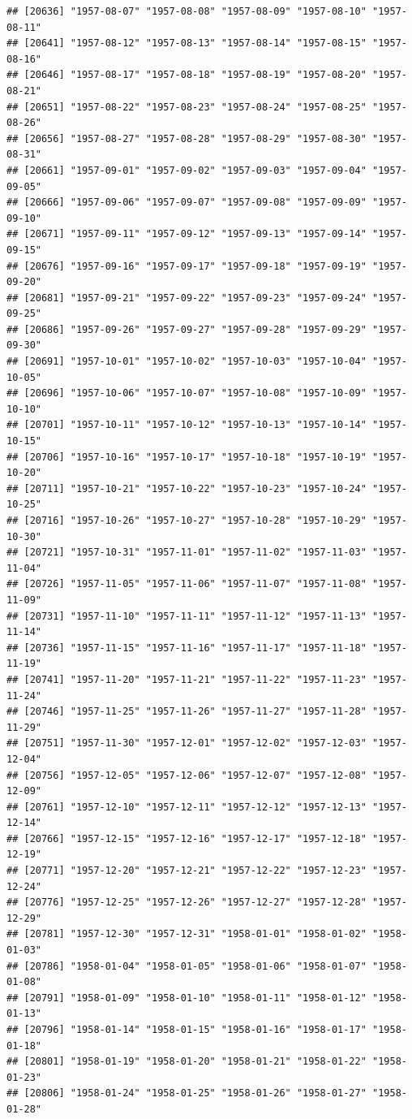 \documentclass{article}\usepackage[]{graphicx}\usepackage[]{color}
\makeatletter
\newenvironment{kframe}{%
 \def\at@end@of@kframe{}%
 \ifinner\ifhmode%
  \def\at@end@of@kframe{\end{minipage}}%
  \begin{minipage}{\columnwidth}%
 \fi\fi%
 \def\FrameCommand##1{\hskip\@totalleftmargin \hskip-\fboxsep
 \colorbox{shadecolor}{##1}\hskip-\fboxsep
     \hskip-\linewidth \hskip-\@totalleftmargin \hskip\columnwidth}%
 \MakeFramed {\advance\hsize-\width
   \@totalleftmargin\z@ \linewidth\hsize
   \@setminipage}}%
 {\par\unskip\endMakeFramed%
 \at@end@of@kframe}
\newenvironment{knitrout}{}{} %
\makeatother
\begin{document}
\begin{description}
\begin{knitrout}
\begin{kframe}
\begin{verbatim}
## [20636] "1957-08-07" "1957-08-08" "1957-08-09" "1957-08-10" "1957-08-11"
## [20641] "1957-08-12" "1957-08-13" "1957-08-14" "1957-08-15" "1957-08-16"
## [20646] "1957-08-17" "1957-08-18" "1957-08-19" "1957-08-20" "1957-08-21"
## [20651] "1957-08-22" "1957-08-23" "1957-08-24" "1957-08-25" "1957-08-26"
## [20656] "1957-08-27" "1957-08-28" "1957-08-29" "1957-08-30" "1957-08-31"
## [20661] "1957-09-01" "1957-09-02" "1957-09-03" "1957-09-04" "1957-09-05"
## [20666] "1957-09-06" "1957-09-07" "1957-09-08" "1957-09-09" "1957-09-10"
## [20671] "1957-09-11" "1957-09-12" "1957-09-13" "1957-09-14" "1957-09-15"
## [20676] "1957-09-16" "1957-09-17" "1957-09-18" "1957-09-19" "1957-09-20"
## [20681] "1957-09-21" "1957-09-22" "1957-09-23" "1957-09-24" "1957-09-25"
## [20686] "1957-09-26" "1957-09-27" "1957-09-28" "1957-09-29" "1957-09-30"
## [20691] "1957-10-01" "1957-10-02" "1957-10-03" "1957-10-04" "1957-10-05"
## [20696] "1957-10-06" "1957-10-07" "1957-10-08" "1957-10-09" "1957-10-10"
## [20701] "1957-10-11" "1957-10-12" "1957-10-13" "1957-10-14" "1957-10-15"
## [20706] "1957-10-16" "1957-10-17" "1957-10-18" "1957-10-19" "1957-10-20"
## [20711] "1957-10-21" "1957-10-22" "1957-10-23" "1957-10-24" "1957-10-25"
## [20716] "1957-10-26" "1957-10-27" "1957-10-28" "1957-10-29" "1957-10-30"
## [20721] "1957-10-31" "1957-11-01" "1957-11-02" "1957-11-03" "1957-11-04"
## [20726] "1957-11-05" "1957-11-06" "1957-11-07" "1957-11-08" "1957-11-09"
## [20731] "1957-11-10" "1957-11-11" "1957-11-12" "1957-11-13" "1957-11-14"
## [20736] "1957-11-15" "1957-11-16" "1957-11-17" "1957-11-18" "1957-11-19"
## [20741] "1957-11-20" "1957-11-21" "1957-11-22" "1957-11-23" "1957-11-24"
## [20746] "1957-11-25" "1957-11-26" "1957-11-27" "1957-11-28" "1957-11-29"
## [20751] "1957-11-30" "1957-12-01" "1957-12-02" "1957-12-03" "1957-12-04"
## [20756] "1957-12-05" "1957-12-06" "1957-12-07" "1957-12-08" "1957-12-09"
## [20761] "1957-12-10" "1957-12-11" "1957-12-12" "1957-12-13" "1957-12-14"
## [20766] "1957-12-15" "1957-12-16" "1957-12-17" "1957-12-18" "1957-12-19"
## [20771] "1957-12-20" "1957-12-21" "1957-12-22" "1957-12-23" "1957-12-24"
## [20776] "1957-12-25" "1957-12-26" "1957-12-27" "1957-12-28" "1957-12-29"
## [20781] "1957-12-30" "1957-12-31" "1958-01-01" "1958-01-02" "1958-01-03"
## [20786] "1958-01-04" "1958-01-05" "1958-01-06" "1958-01-07" "1958-01-08"
## [20791] "1958-01-09" "1958-01-10" "1958-01-11" "1958-01-12" "1958-01-13"
## [20796] "1958-01-14" "1958-01-15" "1958-01-16" "1958-01-17" "1958-01-18"
## [20801] "1958-01-19" "1958-01-20" "1958-01-21" "1958-01-22" "1958-01-23"
## [20806] "1958-01-24" "1958-01-25" "1958-01-26" "1958-01-27" "1958-01-28"

\end{verbatim}
\end{kframe}
\end{knitrout}
\end{description}
\end{document}
